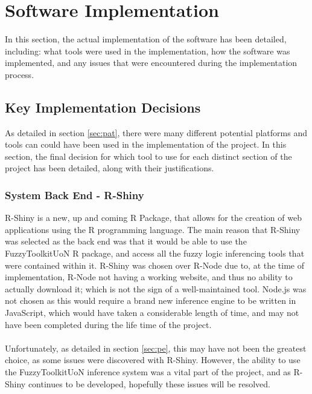 \section{Software Implementation}
In this section, the actual implementation of the software has been detailed, including: what tools were used in the implementation, how the software was implemented, and any issues that were encountered during the implementation process.

\subsection{Key Implementation Decisions}
\label{sec:kid}
As detailed in section \ref{sec:pat}, there were many different potential platforms and tools can could have been used in the implementation of the project. In this section, the final decision for which tool to use for each distinct section of the project has been detailed, along with their justifications.

\tocless\subsubsection{System Back End - R-Shiny}
R-Shiny is a new, up and coming R Package, that allows for the creation of web applications using the R programming language. The main reason that R-Shiny was selected as the back end was that it would be able to use the FuzzyToolkitUoN R package, and access all the fuzzy logic inferencing tools that were contained within it. R-Shiny was chosen over R-Node due to, at the time of implementation, R-Node not having a working website, and thus no ability to actually download it; which is not the sign of a well-maintained tool. Node.js was not chosen as this would require a brand new inference engine to be written in JavaScript, which would have taken a considerable length of time, and may not have been completed during the life time of the project.\ \\
\ \\
Unfortunately, as detailed in section \ref{sec:pe}, this may have not been the greatest choice, as some issues were discovered with R-Shiny. However, the ability to use the FuzzyToolkitUoN inference system was a vital part of the project, and as R-Shiny continues to be developed, hopefully these issues will be resolved.

